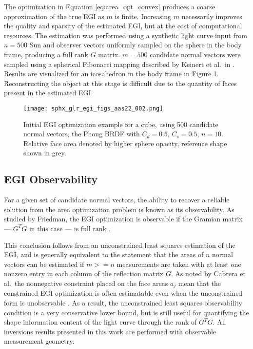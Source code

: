 The optimization in Equation \ref{eq:area_opt_convex} produces a coarse approximation of the true EGI as $m$ is finite. Increasing $m$ necessarily improves the quality and sparsity of the estimated EGI, but at the cost of computational resources. The estimation was performed using a synthetic light curve input from $n=500$ Sun and observer vectors uniformly sampled on the sphere in the body frame, producing a full rank $G$ matrix. $m = 500$ candidate normal vectors were sampled using a spherical Fibonacci mapping described by Keinert et al.\ in \cite{keinert2015}. Results are visualized for an icosahedron in the body frame in Figure \ref{fig:initial_egi_sampling}. Reconstructing the object at this stage is difficult due to the quantity of faces present in the estimated EGI. 

\graphicspath{{/Users/liamrobinson/Documents/PyLightCurves/docs/build/html/_images}}
\begin{figure}[!htb]
  \centering
  \texttt{[image: sphx\_glr\_egi\_figs\_aas22\_002.png]}
  \caption{Initial EGI optimization example for a cube, using 500 candidate normal vectors, the Phong BRDF with $C_d=0.5$, $C_s=0.5$, $n=10$. Relative face area denoted by higher sphere opacity, reference shape shown in grey.}
  \label{fig:initial_egi_sampling}
\end{figure}

\subsection{EGI Observability}

For a given set of candidate normal vectors, the ability to recover a reliable solution from the area optimization problem is known as its observability. As studied by Friedman, the EGI optimization is observable if the Gramian matrix --- $G^T G$ in this case --- is full rank \cite{friedman2020}.

This conclusion follows from an unconstrained least squares estimation of the EGI, and is generally equivalent to the statement that the areas of $n$ normal vectors can be estimated if $m>=n$ measurements are taken with at least one nonzero entry in each column of the reflection matrix $G$. As noted by Cabrera et al.\, the nonnegative constraint placed on the face areas $a_j$ mean that the constrained EGI optimization is often estimatable even when the unconstrained form is unobservable \cite{cabrera2021}. As a result, the unconstrained least squares observability condition is a very conservative lower bound, but is still useful for quantifying the shape information content of the light curve through the rank of $G^T G$. All inversions results presented in this work are performed with observable measurement geometry. 

